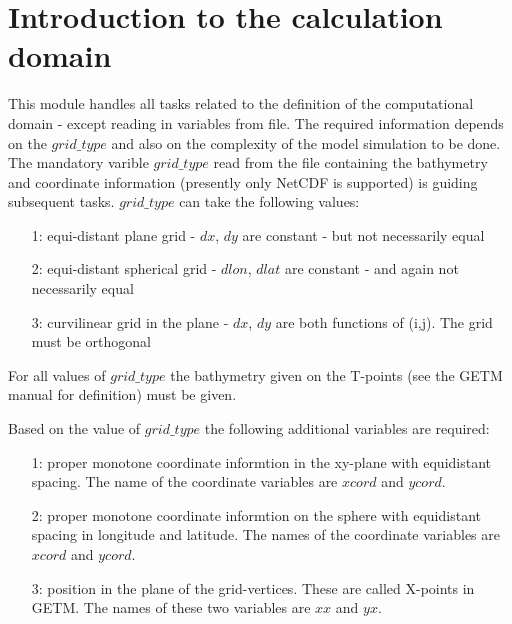 
\section{Introduction to the calculation domain}

\vspace{0.5cm}

  This module handles all tasks related to the definition of the
  computational domain - except reading in variables from file.
  The required information depends on the $grid\_type$ and also on the
  complexity of the model simulation to be done.\newline
  The mandatory varible $grid\_type$ read from the file containing
  the bathymetry and coordinate information (presently only NetCDF
  is supported) is guiding subsequent tasks. $grid\_type$ can take
  the following values:
  \begin{itemize}
      \item[1:] equi-distant plane grid - $dx$, $dy$ are constant - but
                not necessarily equal
      \item[2:] equi-distant spherical grid  - $dlon$, $dlat$ are
                constant - and again not necessarily  equal
      \item[3:] curvilinear grid in the plane - $dx$, $dy$ are both
                functions of (i,j). The grid must be orthogonal
  \end{itemize}

  For all values of $grid\_type$ the bathymetry given on the T-points
  (see the GETM manual for definition) must be given.\newline

  Based on the value of $grid\_type$ the following additional variables
  are required:
  \begin{itemize}
      \item[1:] proper monotone coordinate informtion in the xy-plane
                with equidistant spacing. The name of the coordinate
                variables are $xcord$ and $ycord$.
      \item[2:] proper monotone coordinate informtion on the sphere
                with equidistant spacing in longitude and latitude. The
                names of the coordinate variables are $xcord$ and $ycord$.
      \item[3:] position in the plane of the grid-vertices. These are
                called X-points in GETM. The names of these two variables
                are $xx$ and $yx$.
  \end{itemize}

